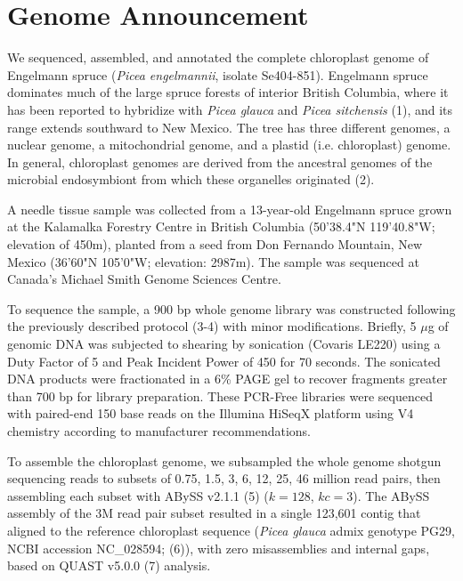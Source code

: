 \documentclass[titlepage,11pt, oneside]{article}   	%
\begin{document}
\section*{Genome Announcement}
We sequenced, assembled, and annotated the complete chloroplast genome of Engelmann spruce (\textit{Picea engelmannii}, isolate Se404-851). Engelmann spruce dominates much of the large spruce forests of interior British Columbia, where it has been reported to hybridize with \textit{Picea glauca} and \textit{Picea sitchensis} (1), and its range extends southward to New Mexico. The tree has three different genomes, a nuclear genome, a mitochondrial genome, and a plastid (i.e. chloroplast) genome. In general, chloroplast genomes are derived from the ancestral genomes of the microbial endosymbiont from which these organelles originated (2).
\newline
\par
A needle tissue sample was collected from a 13-year-old Engelmann spruce grown at the Kalamalka Forestry Centre in British Columbia (50'38.4"N 119'40.8"W; elevation of 450m), planted from a seed from Don Fernando Mountain, New Mexico (36'60"N 105'0"W; elevation: 2987m). The sample was sequenced at Canada’s Michael Smith Genome Sciences Centre.
\newline
\par
To sequence the sample, a 900 bp whole genome library was constructed following the previously described protocol (3-4) with minor modifications. Briefly, 5 $\mu$g of genomic DNA was subjected to shearing by sonication (Covaris LE220) using a Duty Factor of 5 and Peak Incident Power of 450 for 70 seconds. The sonicated DNA products were fractionated in a 6\% PAGE gel to recover fragments greater than 700 bp for library preparation. These PCR-Free libraries were sequenced with paired-end 150 base reads on the Illumina HiSeqX platform using V4 chemistry according to manufacturer recommendations.
\newline
\par
To assemble the chloroplast genome, we subsampled the whole genome shotgun sequencing reads to subsets of 0.75, 1.5, 3, 6, 12, 25, 46 million read pairs, then assembling each subset with ABySS v2.1.1 (5) ($k=128$, $kc=3$). The ABySS assembly of the 3M read pair subset resulted in a single 123,601 contig that aligned to the reference chloroplast sequence (\textit{Picea glauca} admix genotype PG29, NCBI accession NC\_028594; (6)), with zero misassemblies and internal gaps, based on QUAST v5.0.0 (7) analysis.
\end{document}
